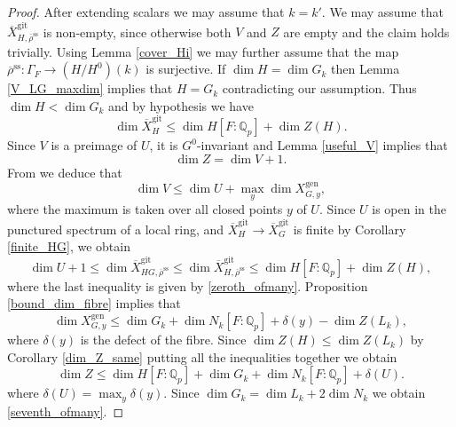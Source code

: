 \documentclass{amsart}
\theoremstyle{definition}
\theoremstyle{remark}
\newcommand{\Qp}{\mathbb {Q}_p}
\newcommand{\rhobar}{\overline{\rho}}
\newcommand{\gen}{\mathrm{gen}}
\newcommand{\gps}{\mathrm{git}}
\newcommand{\Xbar}{\overline{X}}
\newcommand{\rhobarss}{\rhobar^{\mathrm{ss}}}
\begin{document}
\begin{proof} After extending scalars we may assume that $k=k'$. We may assume that 
$\Xbar^{\gps}_{H, \rhobarss}$ is non-empty, since otherwise both $V$ and $Z$ are empty and the claim 
holds trivially. Using Lemma \ref{cover_Hi} we may further assume that the map $\rhobarss: \Gamma_F \rightarrow 
(H/H^0)(k)$ is surjective. If $\dim H=\dim G_k$ then Lemma \ref{V_LG_maxdim} implies that 
$H=G_k$ contradicting our assumption. Thus $\dim H <\dim G_k$ and by hypothesis we have
\begin{equation}\label{zeroth_ofmany}
\dim \Xbar^{\gps}_H \le \dim H [F:\Qp] + \dim Z(H).
\end{equation}
Since $V$ is a preimage of $U$, it is $G^0$-invariant and Lemma \ref{useful_V} implies that 
\begin{equation}\label{first_ofmany} 
\dim Z = \dim V +1.
\end{equation}
From \cite[Lemma 3.18]{BIP_new} we deduce that 
\begin{equation}\label{second_ofmany}
\dim V \le \dim U + \max_{y} \dim X^{\gen}_{G, y},
\end{equation}
where the maximum is taken over all closed points $y$ of $U$. Since $U$ is open in the 
punctured spectrum of a local ring, and $\Xbar^{\gps}_H \rightarrow \Xbar^{\gps}_G$ is finite 
by Corollary  \ref{finite_HG}, we obtain
\begin{equation}\label{third_ofmany}
 \dim U +1\le \dim \Xbar^{\gps}_{HG, \rhobarss} \le \dim \Xbar^{\gps}_{H, \rhobarss} 
\le
\dim H [F:\Qp] + \dim Z(H),
\end{equation}
 where the last inequality is given by \eqref{zeroth_ofmany}. Proposition \ref{bound_dim_fibre} implies that 
\begin{equation}\label{fifth_ofmany} 
\dim X^{\gen}_{G,y} \le \dim G_k+ \dim N_k [F:\Qp] + \delta(y) - \dim Z(L_k), 
\end{equation}
where $\delta(y)$ is the defect of the fibre. 
Since $\dim Z(H)\le \dim Z(L_k)$ by Corollary \ref{dim_Z_same}  putting 
all the inequalities together we obtain 
\begin{equation}\label{sixth_ofmany} 
\dim Z\le \dim H [F:\Qp] + \dim G_k +\dim N_k [F:\Qp] +\delta(U).
\end{equation}
where $\delta(U)=\max_y \delta(y)$. Since $\dim G_k = \dim L_k + 2 \dim N_k$ we 
obtain \eqref{seventh_ofmany}.
\end{proof}
\end{document}
